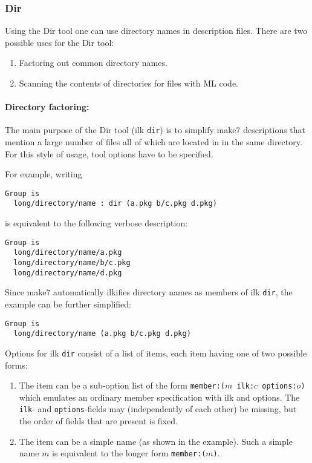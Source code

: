 \subsubsection{Dir}
\label{sec:builtin-tools:dir}

Using the Dir tool one can use directory names in description files.
There are two possible uses for the Dir tool:

\begin{enumerate}
\item Factoring out common directory names.
\item Scanning the contents of directories for files with ML code.
\end{enumerate}

\paragraph{Directory factoring:}
The main purpose of the Dir tool (ilk {\tt dir}) is to simplify make7
descriptions that mention a large number of files all of which are
located in in the same directory.  For this style of usage, tool
options have to be specified.

For example, writing

\begin{verbatim}
Group is
  long/directory/name : dir (a.pkg b/c.pkg d.pkg)
\end{verbatim}

is equivalent to the following verbose description:

\begin{verbatim}
Group is
  long/directory/name/a.pkg
  long/directory/name/b/c.pkg
  long/directory/name/d.pkg
\end{verbatim}

Since make7 automatically ilkifies directory names as members of ilk
{\tt dir}, the example can be further simplified:

\begin{verbatim}
Group is
  long/directory/name (a.pkg b/c.pkg d.pkg)
\end{verbatim}

Options for ilk {\tt dir} consist of a list of items, each item
having one of two possible forms:

\begin{enumerate}
\item The item can be a sub-option list of the form
{\tt member:($m$ ilk:$c$ options:$o$)} which emulates an ordinary
member specification with ilk and options.  The {\tt ilk}- and
{\tt options}-fields may (independently of each other) be missing, but
the order of fields that are present is fixed.
\item The item can be a simple name (as shown in the example).  Such a
simple name $m$ is equivalent to the longer form {\tt member:($m$)}.
\end{enumerate}

